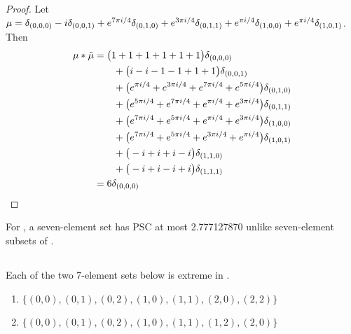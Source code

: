  \begin{proof}
Let  $\mu =  \delta_{(0,0,0)}-i\delta_{(0,0,1)}+e^{7\pi i/4}\delta_{(0,1,0)}+e^{3\pi i/4}\delta_{(0,1,1)}+e^{\pi i/4}\delta_{(1,0,0)}+e^{\pi i/4}\delta_{(1,0,1)}
$.  Then 
\begin{align*} 
\mu * \tilde \mu & = \big(1+1+1+1+1+1\big)\delta_{(0,0,0)}
\\&\qquad
+\big(i-i-1-1+1+1\big)\delta_{(0,0,1)}
\\&\qquad
+\big(e^{\pi i/4}+e^{3\pi i/4}+e^{7\pi i/4}+e^{5\pi i/4}\big)\delta_{(0,1,0)}
\\&\qquad
+\big(e^{5\pi i/4}+e^{7\pi i/4}+e^{\pi i/4}+e^{3\pi i/4}\big)\delta_{(0,1,1)}
\\&\qquad
+\big(e^{7\pi i/4}+e^{5\pi i/4}+e^{\pi i/4}+e^{3\pi i/4}\big)\delta_{(1,0,0)}
\\&\qquad
+\big(e^{7\pi i/4}+e^{5\pi i/4}+e^{3\pi i/4}+e^{\pi i/4}\big)\delta_{(1,0,1)}
\\&\qquad
+\big(-i+i+i-i\big)\delta_{(1,1,0)}
\\&\qquad
+\big(-i+i-i+i\big)\delta_{(1,1,1)}\\&=6\delta_{(0 , 0, 0)}\qedhere
\end{align*}
\end{proof}




For , a seven-element set has PSC   at most 2.777127870 unlike  seven-element subsets of .



\subsection{}

\begin{prop}\label{prop7inZp3.Zp3}
Each of the two 7-element sets below is extreme in .
\begin{enumerate}
\item  $\{(0, 0),  (0, 1),  (0, 2),  (1, 0),  (1, 1),  (2, 0),  (2, 2) \}$ 
\item $\{(0, 0),  (0, 1),  (0, 2),  (1, 0),  (1, 1),  (1, 2),  (2, 0) \}$
\end{enumerate} 

\end{prop}

